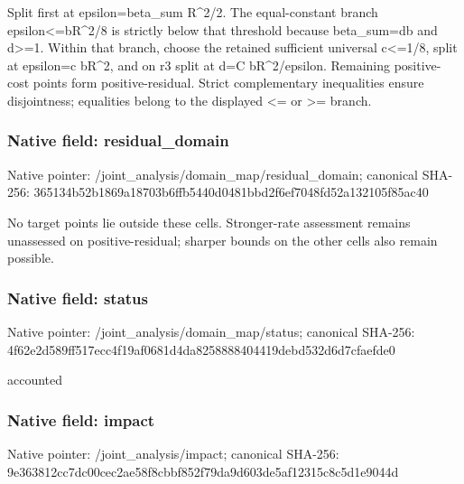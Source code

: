 \documentclass[10pt,a4paper]{article}
\begin{document}
\begingroup\raggedright\sloppy Split first at epsilon=\allowbreak{}beta\_\allowbreak{}sum R\textasciicircum{}2/\allowbreak{}2. The equal-constant branch epsilon<=\allowbreak{}bR\textasciicircum{}2/\allowbreak{}8 is strictly below that threshold because beta\_\allowbreak{}sum=\allowbreak{}db and d>=\allowbreak{}1. Within that branch,\allowbreak{} choose the retained sufficient universal c<=\allowbreak{}1/\allowbreak{}8,\allowbreak{} split at epsilon=\allowbreak{}c bR\textasciicircum{}2,\allowbreak{} and on r3 split at d=\allowbreak{}C bR\textasciicircum{}2/\allowbreak{}epsilon. Remaining positive-cost points form positive-residual. Strict complementary inequalities ensure disjointness;\allowbreak{} equalities belong to the displayed <=\allowbreak{} or >=\allowbreak{} branch.\par\endgroup

\subsubsection{Native field: residual\_\allowbreak{}domain}
Native pointer: /joint\_\allowbreak{}analysis/domain\_\allowbreak{}map/residual\_\allowbreak{}domain; canonical SHA-256: 365134b52b1869a18703b6ffb5440d0481bbd2f6ef7048fd52a132105f85ac40

\begingroup\raggedright\sloppy No target points lie outside these cells. Stronger-rate assessment remains unassessed on positive-residual;\allowbreak{} sharper bounds on the other cells also remain possible.\par\endgroup

\subsubsection{Native field: status}
Native pointer: /joint\_\allowbreak{}analysis/domain\_\allowbreak{}map/status; canonical SHA-256: 4f62e2d589ff517ecc4f19af0681d4da8258888404419debd532d6d7cfaefde0

\begingroup\raggedright\sloppy accounted\par\endgroup

\subsubsection{Native field: impact}
Native pointer: /joint\_\allowbreak{}analysis/impact; canonical SHA-256: 9e363812cc7dc00cec2ae58f8cbbf852f79da9d603de5af12315c8c5d1e9044d
\end{document}
